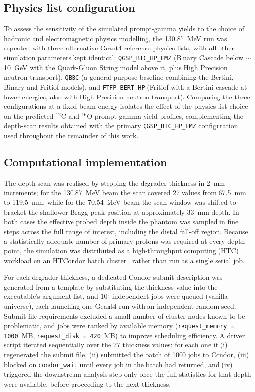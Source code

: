 \documentclass[a4paper]{article}
\begin{document}
\subsection{Physics list configuration}
\label{sec:physlists}

To assess the sensitivity of the simulated prompt-gamma yields to the choice of hadronic and electromagnetic physics modelling, the 130.87~MeV run was repeated with three alternative Geant4 reference physics lists, with all other simulation parameters kept identical: \texttt{QGSP\_BIC\_HP\_EMZ} (Binary Cascade below $\sim$10~GeV with the Quark-Gluon String model above it, plus High Precision neutron transport), \texttt{QBBC} (a general-purpose baseline combining the Bertini, Binary and Fritiof models), and \texttt{FTFP\_BERT\_HP} (Fritiof with a Bertini cascade at lower energies, also with High Precision neutron transport). Comparing the three configurations at a fixed beam energy isolates the effect of the physics list choice on the predicted $^{12}$C and $^{16}$O prompt-gamma yield profiles, complementing the depth-scan results obtained with the primary \texttt{QGSP\_BIC\_HP\_EMZ} configuration used throughout the remainder of this work.

\subsection{Computational implementation}

The depth scan was realised by stepping the degrader thickness in 2~mm increments; for the 130.87~MeV beam the scan covered 27 values from 67.5~mm to 119.5~mm, while for the 70.54~MeV beam the scan window was shifted to bracket the shallower Bragg peak position at approximately 33~mm depth. %
In both cases the effective probed depth inside the phantom was sampled in fine steps across the full range of interest, including the distal fall-off region. Because a statistically adequate number of primary protons was required at every depth point, the simulation was distributed as a high-throughput computing (HTC) workload on an HTCondor batch cluster~\cite{condor} rather than run as a single serial job.

For each degrader thickness, a dedicated Condor submit description was generated from a template by substituting the thickness value into the executable's argument list, and $10^3$ independent jobs were queued (vanilla universe), each launching one Geant4 run with an independent random seed. Submit-file requirements excluded a small number of cluster nodes known to be problematic, and jobs were ranked by available memory (\texttt{request\_memory = 1000}~MB, \texttt{request\_disk = 420}~MB) to improve scheduling efficiency. A driver script iterated sequentially over the 27 thickness values: for each one it (i) regenerated the submit file, (ii) submitted the batch of 1000 jobs to Condor, (iii) blocked on \texttt{condor\_wait} until every job in the batch had returned, and (iv) triggered the downstream analysis step only once the full statistics for that depth were available, before proceeding to the next thickness.
\end{document}

